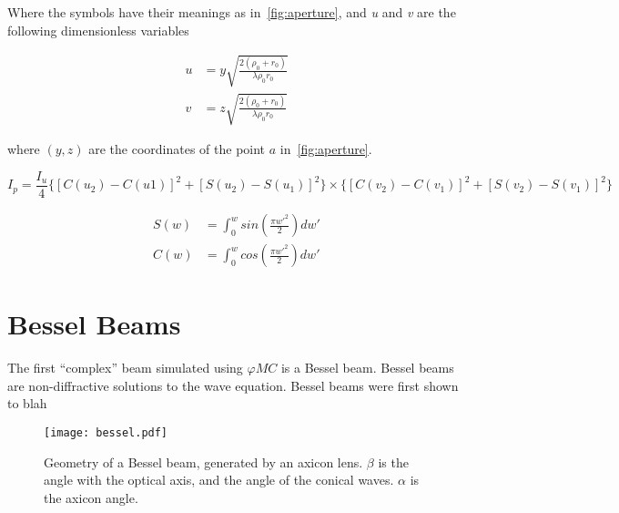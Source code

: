 Where the symbols have their meanings as in~\cref{fig:aperture}, and \textit{u} and \textit{v} are the following dimensionless variables

\begin{align}
u&=y\sqrt{\frac{2(\rho_0+r_0)}{\lambda\rho_0r_0}}\\
v&=z\sqrt{\frac{2(\rho_0+r_0)}{\lambda\rho_0r_0}}
\end{align}

where $(y,z)$ are the coordinates of the point $a$ in~\cref{fig:aperture}.



\begin{equation}
I_p = \frac{I_u}{4} \{[C(u_2) - C(u1)]^2 + [S(u_2) - S(u_1)]^2\} \times \{[C(v_2) - C(v_1)]^2 + [S(v_2) - S(v_1)]^2\}
\label{eqn:fresIntensityp}
\end{equation}

\begin{align}
S(w)&=\int^w_0 sin\left(\frac{\pi w'^2}{2}\right)dw'\label{eqn:fresint1}\\
C(w)&=\int^w_0 cos\left(\frac{\pi w'^2}{2}\right)dw'\label{eqn:fresint2}
\end{align}



\section{Bessel Beams}

The first ``complex'' beam simulated using $\varphi MC$ is a Bessel beam. 
Bessel beams are non-diffractive solutions to the wave equation. 
Bessel beams were first shown to blah




\begin{figure}[!ht]
    \centering
    \texttt{[image: bessel.pdf]}
    \caption{Geometry of a Bessel beam, generated by an axicon lens. $\beta$ is the angle with the optical axis, and the angle of the conical waves. $\alpha$ is the axicon angle.}
    \label{fig:besselgeo}
\end{figure}

